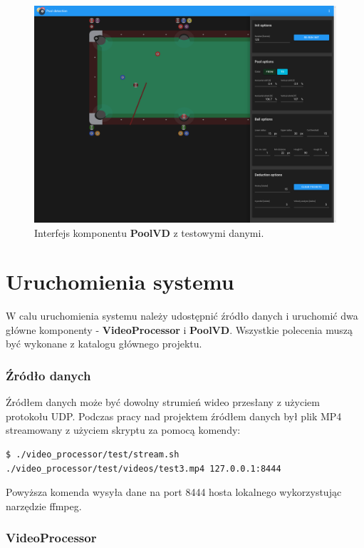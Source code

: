 \documentclass[12pt]{article}
\begin{document}
\begin{figure}[!htb]
    \centering
    \includegraphics[width=15cm]{./images/interface.png}
    \caption{Interfejs komponentu \textbf{PoolVD} z testowymi danymi.}
    \label{interface}
\end{figure}


\FloatBarrier


\section{Uruchomienia systemu}
W calu uruchomienia systemu należy udostępnić źródło danych i uruchomić dwa główne komponenty - \textbf{VideoProcessor} i \textbf{PoolVD}. Wszystkie polecenia muszą być wykonane z katalogu głównego projektu.

\subsubsection{Źródło danych}
Źródłem danych może być dowolny strumień wideo przesłany z użyciem protokołu UDP. Podczas pracy nad projektem źródłem danych był plik MP4 streamowany z użyciem skryptu za pomocą komendy:
\begin{lstlisting}
$ ./video_processor/test/stream.sh ./video_processor/test/videos/test3.mp4 127.0.0.1:8444
\end{lstlisting}
Powyższa komenda wysyła dane na port 8444 hosta lokalnego wykorzystując narzędzie ffmpeg.

\subsubsection{VideoProcessor}
\end{document}
